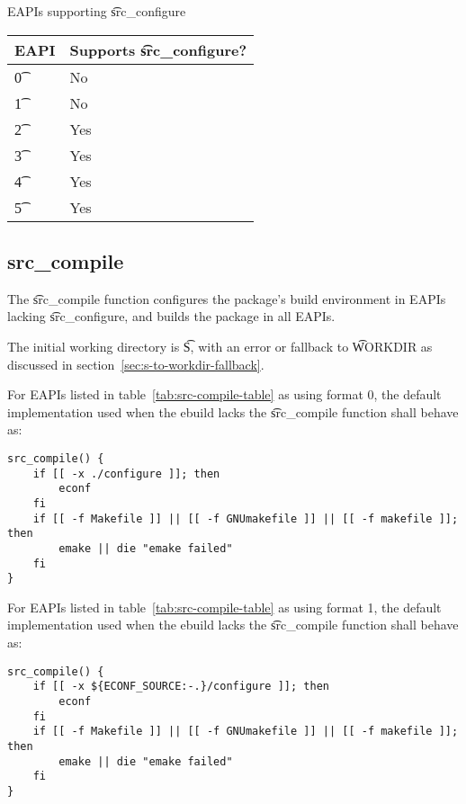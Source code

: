 \begin{centertable}{EAPIs supporting \t{src\_configure}} \label{tab:src-configure-table}
    \begin{tabular}{ l l }
        \toprule
        \multicolumn{1}{c}{\textbf{EAPI}} &
        \multicolumn{1}{c}{\textbf{Supports \t{src\_configure}?}} \\
        \midrule
    \t{0} & No \\
    \t{1} & No \\
    \t{2} & Yes \\
    \t{3} & Yes \\
    \t{4} & Yes \\
    \t{5} & Yes \\
    \bottomrule
    \end{tabular}
\end{centertable}

\subsection{src\_compile}
\label{sec:src-compile-function}

 The \t{src\_compile} function configures the package's build environment
in EAPIs lacking \t{src\_configure}, and builds the package in all EAPIs.

The initial working directory is \t{S}, with an error or fallback to \t{WORKDIR} as discussed in
section~\ref{sec:s-to-workdir-fallback}.

 For EAPIs listed in table~\ref{tab:src-compile-table} as using format
0, the default implementation used when the ebuild lacks the \t{src\_compile} function shall behave
as:

\begin{verbatim}
src_compile() {
    if [[ -x ./configure ]]; then
        econf
    fi
    if [[ -f Makefile ]] || [[ -f GNUmakefile ]] || [[ -f makefile ]]; then
        emake || die "emake failed"
    fi
}
\end{verbatim}

 For EAPIs listed in table~\ref{tab:src-compile-table} as using format
1, the default implementation used when the ebuild lacks the \t{src\_compile} function shall behave
as:

\begin{verbatim}
src_compile() {
    if [[ -x ${ECONF_SOURCE:-.}/configure ]]; then
        econf
    fi
    if [[ -f Makefile ]] || [[ -f GNUmakefile ]] || [[ -f makefile ]]; then
        emake || die "emake failed"
    fi
}
\end{verbatim}

